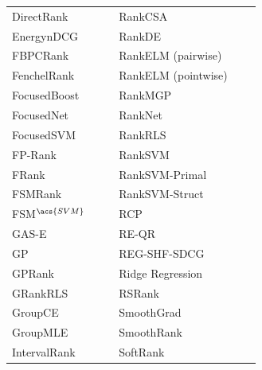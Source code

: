 \begin{table}[!h!p]
{\begin{tabular}{|l|l|l||l|l|l|}
DirectRank & \cite{Tan2013} & \cite{Tan2013} & RankCSA & \cite{He2010} & \cite{He2010} \\ 
Energy\acs{nDCG} & \cite{Freno2011} & \cite{Freno2011} & RankDE & \cite{Bollegala2011} & \cite{Sato2013} \\ 
FBPCRank & \cite{Lai2011} & \cite{Lai2011} & RankELM (pairwise) & \cite{Zong2013} & \cite{Zong2013} \\ 
FenchelRank & \cite{Lai2013} & \cite{Lai2013, Lai2013b, Laporte2013} & RankELM (pointwise) & \cite{Zong2013} & \cite{Zong2013} \\ 
FocusedBoost & \cite{Niu2012} & \cite{Niu2012} & RankMGP & \cite{Lin2012} & \cite{Lin2012} \\ 
FocusedNet & \cite{Niu2012} & \cite{Niu2012} & RankNet & \cite{Burges2005} & \cite{Busa-Fekete2013, Papini2012, Niu2012} \\ 
Focused\acs{SVM} & \cite{Niu2012} & \cite{Niu2012} & Rank\acs{RLS} & \cite{Pahikkala2009} & \cite{Pahikkala2010} \\ 
FP-Rank & \cite{Song2013} & \cite{Song2013} & Rank\acs{SVM} & \cite{Herbrich1999, Joachims2002} & \cite{Busa-Fekete2013, Freno2011, He2010, Alcantara2010} \\ 
FRank & \cite{Tsai2007} & \cite{Wang2012} & Rank\acs{SVM}-Primal &  & \cite{Lai2011} \\ 
FSMRank & \cite{Lai2013c} & \cite{Lai2013c,Laporte2013} & Rank\acs{SVM}-Struct &  &  \\
FSM$^{\acs{SVM}}$ & \cite{Lai2013c} & \cite{Lai2013c} & RCP & \cite{Elsas2008} & \cite{Elsas2008} \\ 
GAS-E & \cite{Geng2007} & \cite{Lai2013c} & RE-QR & \cite{Veloso2010} & \cite{Veloso2010} \\
\acs{GP} & \cite{DeAlmeida2007} & \cite{Alcantara2010} & REG-SHF-SDCG & \cite{Wu2009} & \cite{Wu2009} \\  
\acs{GP}Rank & \cite{Silva2009} & \cite{Torkestani2012} & Ridge Regression & \cite{Cossock2006} &  \\
GRank\acs{RLS} & \cite{Pahikkala2010} & \cite{Pahikkala2010} & RSRank & \cite{Sun2009} & \cite{Lai2013} \\ 
Group\acs{CE} & \cite{Lin2011} & \cite{Lin2011} & SmoothGrad & \cite{Le2007} & \cite{Tan2013} \\ 
Group\acs{MLE} & \cite{Lin2010} & \cite{Lin2011} & SmoothRank & \cite{Chapelle2010} & \cite{Chapelle2010} \\
IntervalRank & \cite{Moon2010} & \cite{Moon2010, Freno2011} & SoftRank & \cite{Taylor2008, Guiver2008} & \cite{Qin2010b} \\ 

\end{tabular}}
\end{table}
